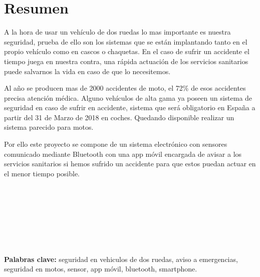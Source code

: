 	\chapter*{Resumen} %

	A la hora de usar un veh\'iculo de dos ruedas lo mas importante es nuestra seguridad, prueba de ello son los sistemas que se est\'an implantando tanto en el propio veh\'iculo como en cascos o chaquetas. En el caso de sufrir un accidente el tiempo juega en nuestra contra, una r\'apida actuación de los servicios sanitarios puede salvarnos la vida en caso de que lo necesitemos.
	
	Al a\~no se producen mas de 2000 accidentes de moto, el 72\% de esos accidentes precisa atenci\'on m\'edica. Alguno veh\'iculos de alta gama ya poseen un sistema de seguridad en caso de sufrir en accidente, sistema que ser\'a obligatorio en España a partir del 31 de Marzo de 2018 en coches. Quedando disponible realizar un sistema parecido para motos.
	
	Por ello este proyecto se compone de un sistema electr\'onico con sensores comunicado mediante Bluetooth con una app m\'ovil encargada de avisar a los servicios sanitarios si hemos sufrido un accidente para que estos puedan actuar en el menor tiempo posible.
	
	\
	\\
	\\
	\\
	\\
	\\
	\\
	\\
	
	\textbf{Palabras clave:} seguridad en vehiculos de dos ruedas, aviso a emergencias, seguridad en motos, sensor, app m\'ovil, bluetooth, smartphone.

	\newpage
	$\ $